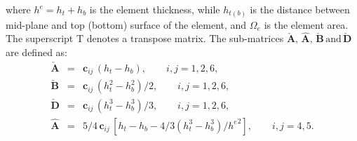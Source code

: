 %
where \(h^e=h_t+h_b\) is the element thickness, while \(h_{t(b)}\) is the distance between mid-plane and top (bottom) surface of the element, and \(\Omega_e\) is the element area.
The superscript T denotes a transpose matrix.
The sub-matrices \(\check{\textbf{A}},\,\hat{\textbf{A}},\,\check{\textbf{B}}\,\mathrm{and}\,\check{\textbf{D}}\) are defined as:
\begin{eqnarray}
	\check{\textbf{A}} & = & \textbf{c}_{ij}\,(h_t-h_b),\qquad i,j=1,2,6\nonumber,\\
	\check{\textbf{B}} & = & \textbf{c}_{ij}\,(h_t^2-h_b^2)/2,\qquad i,j=1,2,6\nonumber,\\
	\check{\textbf{D}} & = & \textbf{c}_{ij}\,(h_t^3-h_b^3)/3,\qquad i,j=1,2,6\nonumber,\\
	\hat{\textbf{A}} & = & 5/4\,\textbf{c}_{ij}\,\left[h_t-h_b-4/3\left(h_t^3-h_b^3\right)/{h^e}^2\right],\qquad i,j=4,5.
\end{eqnarray}
%